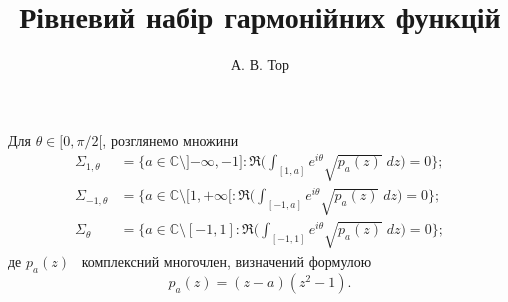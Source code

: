 \documentclass[]{article}
\title{\sffamily Рівневий набір гармонійних функцій}
\author{А. В. Тор}
\date{}
\theoremstyle{plain}
\begin{document}
 
\maketitle
Для $\theta \in [0, \pi/2[$, розглянемо множини
\begin{align*}
    \Sigma_{1,\theta} &= \biggl\{ a \in \mathbb{C} \setminus ]{-\infty}, -1] : \Re \biggl( \int_{[1,a]} e^{i\theta} \sqrt{p_a(z)} \; dz \biggr) = 0 \biggr\}; \\
    \Sigma_{-1,\theta} &= \biggl\{ a \in \mathbb{C} \setminus [1, +\infty[ : \Re \biggl( \int_{[-1,a]} e^{i\theta} \sqrt{p_a(z)} \; dz \biggr) = 0 \biggr\}; \\
    \Sigma_{\theta} &= \biggl\{ a \in \mathbb{C} \setminus [-1, 1] : \Re \biggl( \int_{[-1,1]} e^{i\theta} \sqrt{p_a(z)} \; dz \biggr) = 0 \biggr\};
\end{align*}
де $p_a(z)$ \textemdash\ комплексний многочлен, визначений формулою
\[ p_a(z) = (z - a)(z^2 - 1). \]
\end{document}
